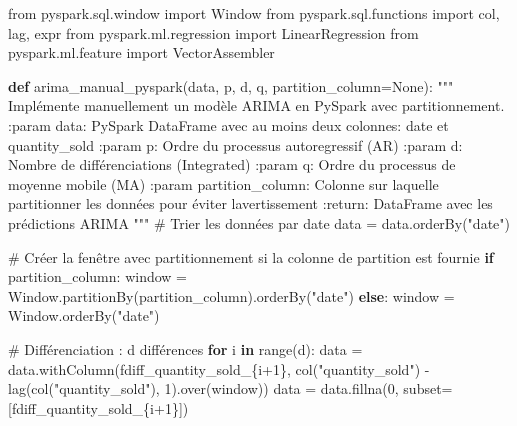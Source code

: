 \documentclass[
  letterpaper,
  DIV=11,
  numbers=noendperiod]{scrartcl}
\newenvironment{Shaded}{\begin{snugshade}}{\end{snugshade}}
\newcommand{\BuiltInTok}[1]{\textcolor[rgb]{0.00,0.23,0.31}{#1}}
\newcommand{\CommentTok}[1]{\textcolor[rgb]{0.37,0.37,0.37}{#1}}
\newcommand{\ControlFlowTok}[1]{\textcolor[rgb]{0.00,0.23,0.31}{\textbf{#1}}}
\newcommand{\DecValTok}[1]{\textcolor[rgb]{0.68,0.00,0.00}{#1}}
\newcommand{\ImportTok}[1]{\textcolor[rgb]{0.00,0.46,0.62}{#1}}
\newcommand{\KeywordTok}[1]{\textcolor[rgb]{0.00,0.23,0.31}{\textbf{#1}}}
\newcommand{\NormalTok}[1]{\textcolor[rgb]{0.00,0.23,0.31}{#1}}
\newcommand{\OperatorTok}[1]{\textcolor[rgb]{0.37,0.37,0.37}{#1}}
\newcommand{\SpecialCharTok}[1]{\textcolor[rgb]{0.37,0.37,0.37}{#1}}
\newcommand{\SpecialStringTok}[1]{\textcolor[rgb]{0.13,0.47,0.30}{#1}}
\newcommand{\StringTok}[1]{\textcolor[rgb]{0.13,0.47,0.30}{#1}}
\newcommand{\VariableTok}[1]{\textcolor[rgb]{0.07,0.07,0.07}{#1}}
\begin{document}
\begin{Shaded}
\begin{Highlighting}[]
\ImportTok{from}\NormalTok{ pyspark.sql.window }\ImportTok{import}\NormalTok{ Window}
\ImportTok{from}\NormalTok{ pyspark.sql.functions }\ImportTok{import}\NormalTok{ col, lag, expr}
\ImportTok{from}\NormalTok{ pyspark.ml.regression }\ImportTok{import}\NormalTok{ LinearRegression}
\ImportTok{from}\NormalTok{ pyspark.ml.feature }\ImportTok{import}\NormalTok{ VectorAssembler}

\KeywordTok{def}\NormalTok{ arima\_manual\_pyspark(data, p, d, q, partition\_column}\OperatorTok{=}\VariableTok{None}\NormalTok{):}
    \CommentTok{"""}
\CommentTok{    Implémente manuellement un modèle ARIMA en PySpark avec partitionnement.}
\CommentTok{    }
\CommentTok{    :param data: PySpark DataFrame avec au moins deux colonnes: \textquotesingle{}date\textquotesingle{} et \textquotesingle{}quantity\_sold\textquotesingle{}}
\CommentTok{    :param p: Ordre du processus autoregressif (AR)}
\CommentTok{    :param d: Nombre de différenciations (Integrated)}
\CommentTok{    :param q: Ordre du processus de moyenne mobile (MA)}
\CommentTok{    :param partition\_column: Colonne sur laquelle partitionner les données pour éviter l\textquotesingle{}avertissement}
\CommentTok{    :return: DataFrame avec les prédictions ARIMA}
\CommentTok{    """}
    \CommentTok{\# Trier les données par date}
\NormalTok{    data }\OperatorTok{=}\NormalTok{ data.orderBy(}\StringTok{"date"}\NormalTok{)}

    \CommentTok{\# Créer la fenêtre avec partitionnement si la colonne de partition est fournie}
    \ControlFlowTok{if}\NormalTok{ partition\_column:}
\NormalTok{        window }\OperatorTok{=}\NormalTok{ Window.partitionBy(partition\_column).orderBy(}\StringTok{"date"}\NormalTok{)}
    \ControlFlowTok{else}\NormalTok{:}
\NormalTok{        window }\OperatorTok{=}\NormalTok{ Window.orderBy(}\StringTok{"date"}\NormalTok{)}

    \CommentTok{\# Différenciation : d différences}
    \ControlFlowTok{for}\NormalTok{ i }\KeywordTok{in} \BuiltInTok{range}\NormalTok{(d):}
\NormalTok{        data }\OperatorTok{=}\NormalTok{ data.withColumn(}\SpecialStringTok{f\textquotesingle{}diff\_quantity\_sold\_}\SpecialCharTok{\{}\NormalTok{i}\OperatorTok{+}\DecValTok{1}\SpecialCharTok{\}}\SpecialStringTok{\textquotesingle{}}\NormalTok{, col(}\StringTok{"quantity\_sold"}\NormalTok{) }\OperatorTok{{-}}\NormalTok{ lag(col(}\StringTok{"quantity\_sold"}\NormalTok{), }\DecValTok{1}\NormalTok{).over(window))}
\NormalTok{        data }\OperatorTok{=}\NormalTok{ data.fillna(}\DecValTok{0}\NormalTok{, subset}\OperatorTok{=}\NormalTok{[}\SpecialStringTok{f\textquotesingle{}diff\_quantity\_sold\_}\SpecialCharTok{\{}\NormalTok{i}\OperatorTok{+}\DecValTok{1}\SpecialCharTok{\}}\SpecialStringTok{\textquotesingle{}}\NormalTok{])}


\end{Highlighting}
\end{Shaded}
\end{document}
